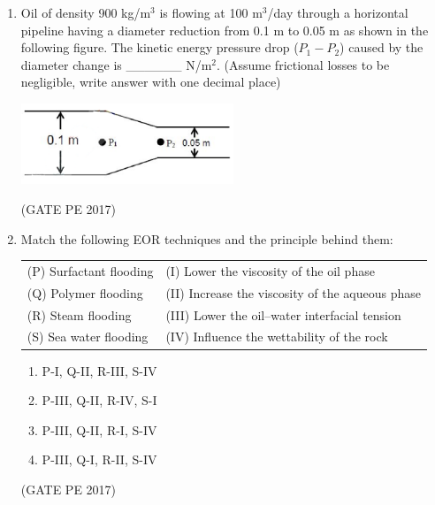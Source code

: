 \documentclass[journal,12pt,onecolumn]{IEEEtran}
\theoremstyle{remark}
\begin{document}
\begin{enumerate}[start=1, label={Q\arabic*.}]
\item Oil of density 900 kg/m$^3$ is flowing at 100 m$^3$/day through a horizontal pipeline having a diameter reduction from 0.1 m to 0.05 m as shown in the following figure.
The kinetic energy pressure drop ($P_1 - P_2$) caused by the diameter change is \_\_\_\_\_\_ N/m$^2$.
(Assume frictional losses to be negligible, write answer with one decimal place)
\begin{center}
    \includegraphics[width=0.5\textwidth]{Figs/figQ_39.png}
\end{center}
\hfill{(GATE PE 2017)}

\item Match the following EOR techniques and the principle behind them:\\

\begin{tabular}{ll}
(P) Surfactant flooding & (I) Lower the viscosity of the oil phase \\
(Q) Polymer flooding & (II) Increase the viscosity of the aqueous phase \\
(R) Steam flooding & (III) Lower the oil–water interfacial tension \\
(S) Sea water flooding & (IV) Influence the wettability of the rock \\
\end{tabular}
\begin{enumerate}
\item P-I, Q-II, R-III, S-IV \\
\item P-III, Q-II, R-IV, S-I \\
\item P-III, Q-II, R-I, S-IV \\
\item P-III, Q-I, R-II, S-IV
\end{enumerate}
\hfill{(GATE PE 2017)}


\end{enumerate}
\end{document}
